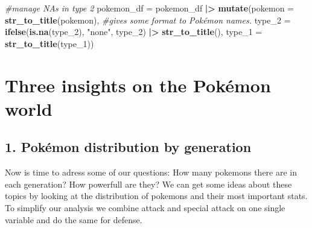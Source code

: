 \documentclass[
]{article}
\newenvironment{Shaded}{\begin{snugshade}}{\end{snugshade}}
\newcommand{\AttributeTok}[1]{\textcolor[rgb]{0.13,0.29,0.53}{#1}}
\newcommand{\CommentTok}[1]{\textcolor[rgb]{0.56,0.35,0.01}{\textit{#1}}}
\newcommand{\FunctionTok}[1]{\textcolor[rgb]{0.13,0.29,0.53}{\textbf{#1}}}
\newcommand{\NormalTok}[1]{#1}
\newcommand{\OtherTok}[1]{\textcolor[rgb]{0.56,0.35,0.01}{#1}}
\newcommand{\SpecialCharTok}[1]{\textcolor[rgb]{0.81,0.36,0.00}{\textbf{#1}}}
\newcommand{\StringTok}[1]{\textcolor[rgb]{0.31,0.60,0.02}{#1}}
\begin{document}
\begin{Shaded}
\begin{Highlighting}[]
\CommentTok{\#manage NAs in type 2}
\NormalTok{pokemon\_df }\OtherTok{=}\NormalTok{ pokemon\_df }\SpecialCharTok{|\textgreater{}} 
  \FunctionTok{mutate}\NormalTok{(}\AttributeTok{pokemon =} \FunctionTok{str\_to\_title}\NormalTok{(pokemon), }\CommentTok{\#gives some format to Pokémon names.}
         \AttributeTok{type\_2 =} \FunctionTok{ifelse}\NormalTok{(}\FunctionTok{is.na}\NormalTok{(type\_2), }\StringTok{"none"}\NormalTok{, type\_2) }\SpecialCharTok{|\textgreater{}} \FunctionTok{str\_to\_title}\NormalTok{(),}
         \AttributeTok{type\_1 =} \FunctionTok{str\_to\_title}\NormalTok{(type\_1))}
\end{Highlighting}
\end{Shaded}

\section{Three insights on the Pokémon
world}\label{three-insights-on-the-pokuxe9mon-world}

\subsection{1. Pokémon distribution by
generation}\label{pokuxe9mon-distribution-by-generation}

Now is time to adress some of our questions: How many pokemons there are
in each generation? How powerfull are they? We can get some ideas about
these topics by looking at the distribution of pokemons and their most
important stats. To simplify our analysis we combine attack and special
attack on one single variable and do the same for defense.
\end{document}
